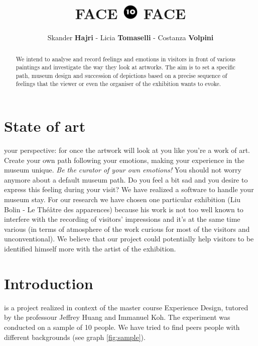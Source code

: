 \documentclass[journal, a4paper]{IEEEtran}
\begin{document}
\title{FACE {\vspace*{0.20cm}\includegraphics[width = 7.9mm]{io.png}} FACE \\ }
\author{Skander \textbf{Hajri} - Licia \textbf{Tomaselli} - Costanza \textbf{Volpini}}
\maketitle

\begin{abstract} 
We intend to analyse and record feelings and emotions in visitors in front of various paintings and investigate the way they look at artworks. The aim is to set a specific path, museum design and succession of depictions based on a precise sequence of feelings that the viewer or even the organiser of the exhibition wants to evoke.
\end{abstract}

\section{State of art}
 your perspective: for once the artwork will look at you like you’re a work of art. Create your own path following your emotions, making your experience in the museum unique. \textit{Be the curator of your own emotions!}
You should not worry anymore about a default museum path. Do you feel a bit sad and you desire to express this feeling during your visit? We have realized a software to handle your museum stay. For our research we have chosen one particular exhibition (Liu Bolin - Le Théâtre des apparences) because his work is not too well known to interfere with the recording of visitors’ impressions and it’s at the same time various (in terms of atmosphere of the work curious for most of the visitors and unconventional). We believe that our project could potentially help visitors to be identified himself more with the artist of the exhibition.

\section{Introduction}
 is a project realized in context of the master course Experience Design, tutored by the professour Jeffrey Huang and Immanuel Koh. The experiment was conducted on a sample of 10 people. We have tried to find peers people with different backgrounds (see graph \ref{fig:sample}).
\end{document}
